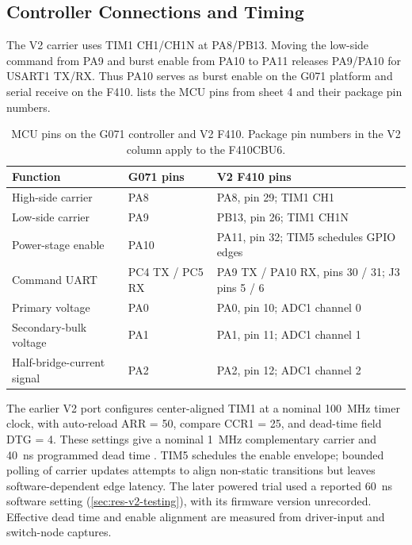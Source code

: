 \subsection{Controller Connections and Timing}

The V2 carrier uses TIM1 CH1/CH1N at PA8/PB13. Moving the low-side command from PA9 and burst enable from PA10 to PA11 releases PA9/PA10 for USART1 TX/RX. Thus PA10 serves as burst enable on the G071 platform and serial receive on the F410.  lists the MCU pins from sheet 4 and their package pin numbers.

\begin{table}[H]
\centering
\caption{MCU pins on the G071 controller and V2 F410. Package pin numbers in the V2 column apply to the F410CBU6.}
\label{tab:hw-v2-pinmap}
\small
\begin{tabularx}{\textwidth}{@{}p{}p{}X@{}}
\toprule
Function & G071 pins & V2 F410 pins\\
\midrule
High-side carrier & PA8 & PA8, pin 29; TIM1 CH1\\
Low-side carrier & PA9 & PB13, pin 26; TIM1 CH1N\\
Power-stage enable & PA10 & PA11, pin 32; TIM5 schedules GPIO edges\\
Command UART & PC4 TX / PC5 RX & PA9 TX / PA10 RX, pins 30 / 31; J3 pins 5 / 6\\
Primary voltage & PA0 & PA0, pin 10; ADC1 channel 0\\
Secondary-bulk voltage & PA1 & PA1, pin 11; ADC1 channel 1\\
Half-bridge-current signal & PA2 & PA2, pin 12; ADC1 channel 2\\
\bottomrule
\end{tabularx}
\end{table}

The earlier V2 port configures center-aligned TIM1 at a nominal \SI{100}{\mega\hertz} timer clock, with auto-reload ARR = 50, compare CCR1 = 25, and dead-time field DTG = 4. These settings give a nominal \SI{1}{\mega\hertz} complementary carrier and \SI{40}{\nano\second} programmed dead time \cite{ststm32f410rm}. TIM5 schedules the enable envelope; bounded polling of carrier updates attempts to align non-static transitions but leaves software-dependent edge latency. The later powered trial used a reported \SI{60}{\nano\second} software setting (\cref{sec:res-v2-testing}), with its firmware version unrecorded. Effective dead time and enable alignment are measured from driver-input and switch-node captures.

